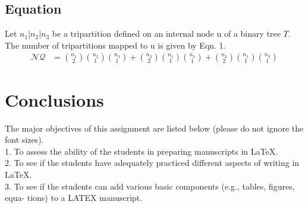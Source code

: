 \documentclass[28pt, a4paper]{article}
\begin{document}
	\subsection{Equation}
	Let $n_1$|$n_2$|$n_3$ be a tripartition defined on an internal node u of a binary tree $T$. The
	number of tripartitions mapped to u is given by Eqn. 1.
	\begin{align}
		\mathcal{N}\mathcal{Q}  &= \binom{n_1}{2} \binom{n_2}{1} \binom{n_3}{1} + \binom{n_2}{2} \binom{n_1}{1} \binom{n_3}{1} + \binom{n_3}{2} \binom{n_1}{1} \binom{n_2}{1}
	\end{align} 
	\section{Conclusions}
	The major objectives of this assignment are listed below (please do not ignore the font
	sizes). \\
	\huge{1. To assess the ability of the students in preparing manuscripts
	in \LaTeX.} \\
	\large{2. To see if the students have adequately practiced different aspects of
	writing in \LaTeX.} \\
	3. To see if the students can add various basic components (e.g., tables, figures, equa-
	tions) to a LATEX manuscript.
	
\end{document}
